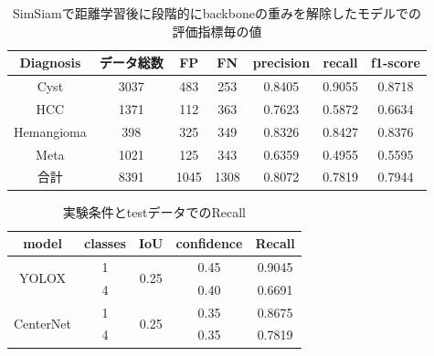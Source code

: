 \documentclass[a4j]{ujarticle}
\begin{document}
        \begin{table}[!h]
            \centering
            \caption{SimSiam\cite{simsiam}で距離学習後に段階的にbackboneの重みを解除したモデルでの評価指標毎の値}
            \label{tab:metric_center_stepwise}
            \begin{tabular}{c|ccc|ccc} \hline
                Diagnosis & データ総数 & FP & FN & precision & recall & f1-score \\ \hline
                Cyst & 3037 & 483 & 253 & 0.8405 & 0.9055 & 0.8718 \\
                HCC & 1371 & 112 & 363 & 0.7623 & 0.5872 & 0.6634 \\
                Hemangioma & 398 & 325 & 349 & 0.8326 & 0.8427 & 0.8376 \\
                Meta & 1021 & 125 & 343 & 0.6359 & 0.4955 & 0.5595 \\ \hline
                合計 & 8391 & 1045 & 1308 & 0.8072 & 0.7819 & 0.7944 \\ \hline
            \end{tabular}
        \end{table}

        \begin{table}[!h]
            \centering
            \caption{実験条件とtestデータでのRecall}
            \label{tab:exp}
            \begin{tabular}{cccc|c} \hline
                model & classes & IoU & confidence & Recall \\ \hline
                \multirow{2}{*}{YOLOX\cite{yolox}} & 1 & \multirow{2}{*}{0.25} & 0.45 & 0.9045 \\
                & 4 & & 0.40 & 0.6691 \\ \hline
                \multirow{2}{*}{CenterNet\cite{centernet}} & 1 & \multirow{2}{*}{0.25} & 0.35 & 0.8675 \\
                & 4 & & 0.35 & 0.7819 \\ \hline
            \end{tabular}
        \end{table}
\end{document}
